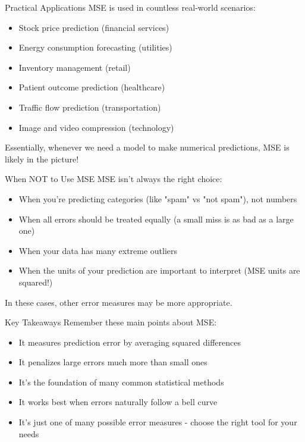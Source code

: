 \documentclass{beamer}
\begin{document}
\begin{frame}{Practical Applications}
  MSE is used in countless real-world scenarios:
  
  \begin{itemize}
    \item Stock price prediction (financial services)
    \item Energy consumption forecasting (utilities)
    \item Inventory management (retail)
    \item Patient outcome prediction (healthcare)
    \item Traffic flow prediction (transportation)
    \item Image and video compression (technology)
  \end{itemize}
  
  Essentially, whenever we need a model to make numerical predictions, MSE is likely in the picture!
\end{frame}

\begin{frame}{When NOT to Use MSE}
  MSE isn't always the right choice:
  
  \begin{itemize}
    \item When you're predicting categories (like "spam" vs "not spam"), not numbers
    \item When all errors should be treated equally (a small miss is as bad as a large one)
    \item When your data has many extreme outliers
    \item When the units of your prediction are important to interpret (MSE units are squared!)
  \end{itemize}
  
  In these cases, other error measures may be more appropriate.
\end{frame}

\begin{frame}{Key Takeaways}
  Remember these main points about MSE:
  
  \begin{itemize}
    \item It measures prediction error by averaging squared differences
    \item It penalizes large errors much more than small ones
    \item It's the foundation of many common statistical methods
    \item It works best when errors naturally follow a bell curve
    \item It's just one of many possible error measures - choose the right tool for your needs
  \end{itemize}
\end{frame}
\end{document}
